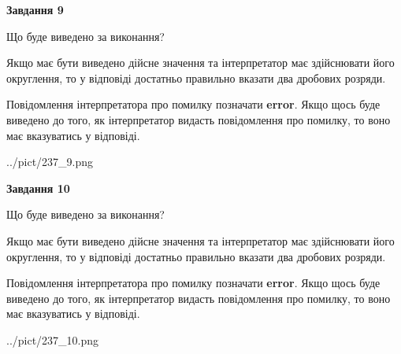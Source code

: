 \documentclass[12pt, ukrainian]{article}
\begin{document}
{\begin {Large}
{\begin {center}\textbf{Завдання 9}\end {center}}\par
Що буде виведено за виконання? \par

Якщо має бути виведено дійсне значення та інтерпретатор має здійснювати його округлення, 
то у відповіді достатньо правильно вказати два дробових розряди.

Повідомлення інтерпретатора про помилку позначати \textbf{error}.
Якщо щось буде виведено до того, як інтерпретатор видасть повідомлення про помилку, 
то воно має вказуватись у відповіді. \par

\begin{center}
	{../pict/237_9.png}
\end{center}
\newpage

{\begin {center}\textbf{Завдання 10}\end {center}}\par
Що буде виведено за виконання? \par

Якщо має бути виведено дійсне значення та інтерпретатор має здійснювати його округлення, 
то у відповіді достатньо правильно вказати два дробових розряди.

Повідомлення інтерпретатора про помилку позначати \textbf{error}.
Якщо щось буде виведено до того, як інтерпретатор видасть повідомлення про помилку, 
то воно має вказуватись у відповіді. \par

\begin{center}
	{../pict/237_10.png}
\end{center}
\newpage

\end {Large}}
\end{document}
